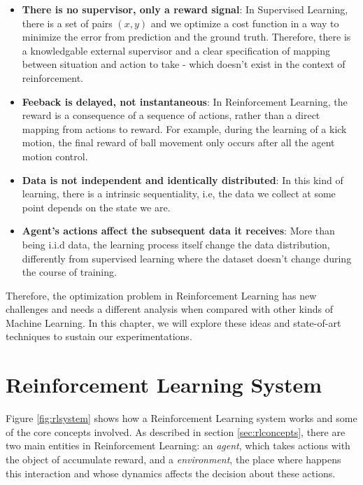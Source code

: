\begin{itemize}
	\item \textbf{There is no supervisor, only a reward signal}: In Supervised Learning, there is a set of pairs $(x, y)$ and we optimize a cost function in a way to minimize the error from prediction and the ground truth. Therefore, there is a knowledgable external supervisor and a clear specification of mapping between situation and action to take - which doesn't exist in the context of reinforcement.
	
	\item \textbf{Feeback is delayed, not instantaneous}: In Reinforcement Learning, the reward is a consequence of a sequence of actions, rather than a direct mapping from actions to reward. For example, during the learning of a kick motion, the final reward of ball movement only occurs after all the agent motion control.
	
	\item \textbf{Data is not independent and identically distributed}: In this kind of learning, there is a intrinsic sequentiality, i.e, the data we collect at some point depends on the state we are.
	
	\item \textbf{Agent's actions affect the subsequent data it receives}: More than being i.i.d data, the learning process itself change the data distribution, differently from supervised learning where the dataset doesn't change during the course of training.
\end{itemize}


Therefore, the optimization problem in Reinforcement Learning has new challenges and needs a different analysis when compared with other kinds of Machine Learning. In this chapter, we will explore these ideas and state-of-art techniques to sustain our experimentations.

\section{Reinforcement Learning System}\label{sec:rlsystem}

Figure \ref{fig:rlsystem} shows how a Reinforcement Learning system works and some of the core concepts involved. As described in section \ref{sec:rlconcepts}, there are two main entities in Reinforcement Learning: an \textit{agent}, which takes actions with the object of accumulate reward, and a \textit{environment}, the place where happens this interaction and whose dynamics affects the decision about these actions.

